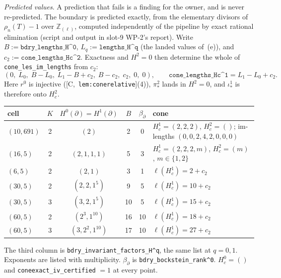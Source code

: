 \documentclass[11pt]{article}
\theoremstyle{remark}
\newcommand{\Z}{\mathbb{Z}}
\newcommand{\HA}[1]{[C,~\texttt{#1}]}      %
\begin{document}
\emph{Predicted values}. A prediction that fails is a finding for the owner, and is never
re-predicted. The boundary is predicted exactly, from the elementary divisors of $\rho_n(T)-1$
over $\Z_{(\ell)}$, computed independently of the pipeline by exact rational elimination (script and
output in slot-9 WP-2's report). Write $B:=\texttt{bdry\_lengths\_H\textasciicircum0}$,
$L_q:=\texttt{lengths\_H\textasciicircum q}$ (the landed values of~(e)), and
$c_2:=\texttt{cone\_lengths\_Hc\textasciicircum2}$. Exactness and $H^2=0$ then determine the
whole of \texttt{cone\_les\_im\_lengths} from $c_2$:
\[
  (0,\;L_0,\;B-L_0,\;L_1-B+c_2,\;B-c_2,\;c_2,\;0,\;0),\qquad
  \texttt{cone\_lengths\_Hc\textasciicircum1}=L_1-L_0+c_2 .
\]
Here $r^0$ is injective (\HA{lem:conerelative}(4)), $\pi^2_{\ast}$ lands in $H^2=0$, and
$\iota^1_{\ast}$ is therefore onto $H^2_c$.
\begin{center}\small
\begin{tabular}{@{}lccccp{}@{}}
\toprule
cell & $K$ & $H^0(\partial)=H^1(\partial)$ & $B$ & $\beta_{\partial}$ & cone \\
\midrule
$(10,691)$ & 2 & $(2)$ & 2 & 0 & $H^1_c=(2,2,2)$, $H^2_c=()$; im-lengths $(0,0,2,4,2,0,0,0)$ \\
$(16,5)$ & 2 & $(2,1,1,1)$ & 5 & 3 & $H^1_c=(2,2,2,m)$, $H^2_c=(m)$, $m\in\{1,2\}$ \\
$(6,5)$ & 2 & $(2,1)$ & 3 & 1 & $\ell(H^1_c)=2+c_2$ \\
$(30,5)$ & 2 & $(2,2,1^5)$ & 9 & 5 & $\ell(H^1_c)=10+c_2$ \\
$(30,5)$ & 3 & $(3,2,1^5)$ & 10 & 5 & $\ell(H^1_c)=15+c_2$ \\
$(60,5)$ & 2 & $(2^3,1^{10})$ & 16 & 10 & $\ell(H^1_c)=18+c_2$ \\
$(60,5)$ & 3 & $(3,2^2,1^{10})$ & 17 & 10 & $\ell(H^1_c)=27+c_2$ \\
\bottomrule
\end{tabular}
\end{center}
\noindent The third column is \texttt{bdry\_invariant\_factors\_H\textasciicircum q}, the same list at $q=0,1$. Exponents are listed with multiplicity. $\beta_{\partial}$ is
\texttt{bdry\_bockstein\_rank\textasciicircum0}. $H^0_c=()$ and \texttt{coneexact\_iv\_certified}
$=1$ at every point.
\end{document}
